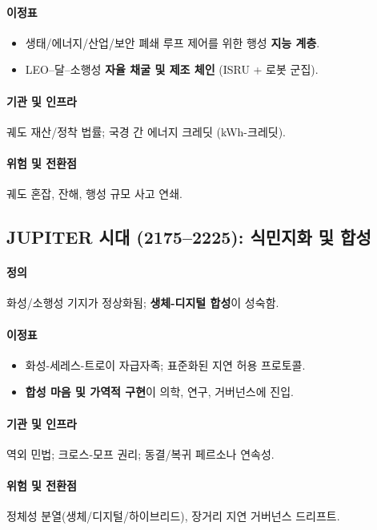\documentclass[11pt]{article}
\begin{document}
\paragraph{이정표}
\begin{itemize}[noitemsep]
  \item 생태/에너지/산업/보안 폐쇄 루프 제어를 위한 행성 \textbf{지능 계층}.
  \item LEO–달–소행성 \textbf{자율 채굴 및 제조 체인} (ISRU + 로봇 군집).
\end{itemize}

\paragraph{기관 및 인프라} 궤도 재산/정착 법률; 국경 간 에너지 크레딧 (kWh-크레딧).

\paragraph{위험 및 전환점} 궤도 혼잡, 잔해, 행성 규모 사고 연쇄.

\subsection{JUPITER 시대 (2175–2225): 식민지화 및 합성}
\paragraph{정의} 화성/소행성 기지가 정상화됨; \textbf{생체-디지털 합성}이 성숙함.

\paragraph{이정표}
\begin{itemize}[noitemsep]
  \item 화성-세레스-트로이 자급자족; 표준화된 지연 허용 프로토콜.
  \item \textbf{합성 마음 및 가역적 구현}이 의학, 연구, 거버넌스에 진입.
\end{itemize}

\paragraph{기관 및 인프라} 역외 민법; 크로스-모프 권리; 동결/복귀 페르소나 연속성.

\paragraph{위험 및 전환점} 정체성 분열(생체/디지털/하이브리드), 장거리 지연 거버넌스 드리프트.
\end{document}
